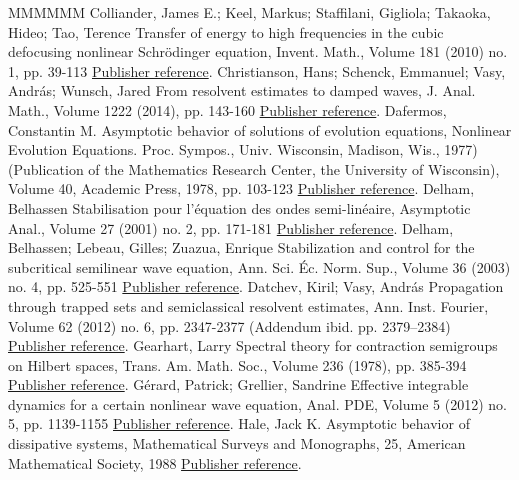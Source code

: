\documentclass[11pt]{article}
\theoremstyle{definition}
\numberwithin{equation}{section}
\numberwithin{figure}{section}
\numberwithin{table}{section}
\begin{document}
\begin{thebibliography}{MMMMMM}
 Colliander, James E.; Keel, Markus; Staffilani, Gigliola; Takaoka, Hideo; Tao, Terence Transfer of energy to high frequencies in the cubic defocusing nonlinear Schrödinger equation, Invent. Math., Volume 181 (2010) no. 1, pp. 39-113 \href{https://ahl.centre-mersenne.org/item/AHL_2020__3__1241_0/#Colliander}{Publisher reference}.
 Christianson, Hans; Schenck, Emmanuel; Vasy, András; Wunsch, Jared From resolvent estimates to damped waves, J. Anal. Math., Volume 1222 (2014), pp. 143-160 \href{https://ahl.centre-mersenne.org/item/AHL_2020__3__1241_0/#CSVW}{Publisher reference}.
 Dafermos, Constantin M. Asymptotic behavior of solutions of evolution equations, Nonlinear Evolution Equations. Proc. Sympos., Univ. Wisconsin, Madison, Wis., 1977) (Publication of the Mathematics Research Center, the University of Wisconsin), Volume 40, Academic Press, 1978, pp. 103-123 \href{https://ahl.centre-mersenne.org/item/AHL_2020__3__1241_0/#Dafermos}{Publisher reference}.
 Delham, Belhassen Stabilisation pour l’équation des ondes semi-linéaire, Asymptotic Anal., Volume 27 (2001) no. 2, pp. 171-181 \href{https://ahl.centre-mersenne.org/item/AHL_2020__3__1241_0/#Dehman}{Publisher reference}.
 Delham, Belhassen; Lebeau, Gilles; Zuazua, Enrique Stabilization and control for the subcritical semilinear wave equation, Ann. Sci. Éc. Norm. Sup., Volume 36 (2003) no. 4, pp. 525-551 \href{https://ahl.centre-mersenne.org/item/AHL_2020__3__1241_0/#DLZ}{Publisher reference}.
 Datchev, Kiril; Vasy, András Propagation through trapped sets and semiclassical resolvent estimates, Ann. Inst. Fourier, Volume 62 (2012) no. 6, pp. 2347-2377 (Addendum ibid. pp. 2379–2384) \href{https://ahl.centre-mersenne.org/item/AHL_2020__3__1241_0/#Vasy}{Publisher reference}.
 Gearhart, Larry Spectral theory for contraction semigroups on Hilbert spaces, Trans. Am. Math. Soc., Volume 236 (1978), pp. 385-394 \href{https://ahl.centre-mersenne.org/item/AHL_2020__3__1241_0/#Ge}{Publisher reference}.
 Gérard, Patrick; Grellier, Sandrine Effective integrable dynamics for a certain nonlinear wave equation, Anal. PDE, Volume 5 (2012) no. 5, pp. 1139-1155 \href{https://ahl.centre-mersenne.org/item/AHL_2020__3__1241_0/#Gerard-Grellier}{Publisher reference}.
 Hale, Jack K. Asymptotic behavior of dissipative systems, Mathematical Surveys and Monographs, 25, American Mathematical Society, 1988 \href{https://ahl.centre-mersenne.org/item/AHL_2020__3__1241_0/#Hale-book}{Publisher reference}.

\end{thebibliography}
\end{document}
